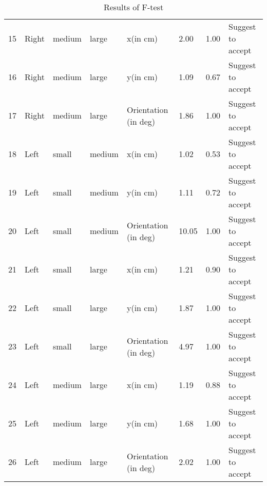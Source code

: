 \begin{table}[]
{\begin{tabular}{@{}llllllll@{}}
    15      & Right     & medium      & large       & x(in cm)             & 2.00    & 1.00    & Suggest to accept \\
    16      & Right     & medium      & large       & y(in cm)             & 1.09    & 0.67    & Suggest to accept \\
    17      & Right     & medium      & large       & Orientation (in deg) & 1.86    & 1.00    & Suggest to accept \\
    18      & Left      & small       & medium      & x(in cm)             & 1.02    & 0.53    & Suggest to accept \\
    19      & Left      & small       & medium      & y(in cm)             & 1.11    & 0.72    & Suggest to accept \\
    20      & Left      & small       & medium      & Orientation (in deg) & 10.05   & 1.00    & Suggest to accept \\
    21      & Left      & small       & large       & x(in cm)             & 1.21    & 0.90    & Suggest to accept \\
    22      & Left      & small       & large       & y(in cm)             & 1.87    & 1.00    & Suggest to accept \\
    23      & Left      & small       & large       & Orientation (in deg) & 4.97    & 1.00    & Suggest to accept \\
    24      & Left      & medium      & large       & x(in cm)             & 1.19    & 0.88    & Suggest to accept \\
    25      & Left      & medium      & large       & y(in cm)             & 1.68    & 1.00    & Suggest to accept \\
    26      & Left      & medium      & large       & Orientation (in deg) & 2.02    & 1.00    & Suggest to accept \\ \bottomrule
    \end{tabular}%
    }
    \caption{Results of F-test}
    \label{tab:f-test}
    \end{table}
    
    

